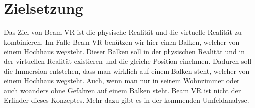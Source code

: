 \section{Zielsetzung}\label{sec: objective}

Das Ziel von Beam VR ist die physische Realität und die virtuelle Realität zu kombinieren.
Im Falle Beam VR benützen wir hier einen Balken, welcher von einem Hochhaus wegsteht.
Dieser Balken soll in der physischen Realität und in der virtuellen Realität existieren und die gleiche Position einehmen.
Dadurch soll die Immersion entstehen, dass man wirklich auf einem Balken steht, welcher von einem Hochhaus wegsteht.
Auch, wenn man nur in seinem Wohnzimmer oder auch woanders ohne Gefahren auf einem Balken steht.
Beam VR ist nicht der Erfinder dieses Konzeptes.
Mehr dazu gibt es in der kommenden Umfeldanalyse.

